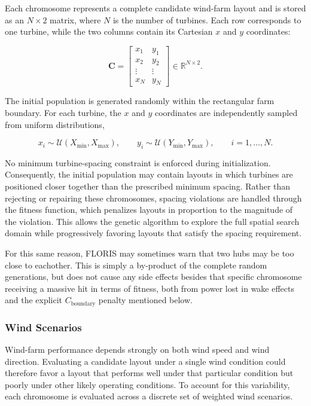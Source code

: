 \documentclass[11pt]{article}
\begin{document}
Each chromosome represents a complete candidate wind-farm layout and is stored as an $N \times 2$ matrix, where $N$ is the number of turbines. Each row corresponds to one turbine, while the two columns contain its Cartesian $x$ and $y$ coordinates:

\begin{equation}
\mathbf{C} =
\begin{bmatrix}
x_1 & y_1 \\
x_2 & y_2 \\
\vdots & \vdots \\
x_N & y_N
\end{bmatrix}
\in \mathbb{R}^{N \times 2}.
\label{eq:chromosome}
\end{equation}

The initial population is generated randomly within the rectangular farm boundary. For each turbine, the $x$ and $y$ coordinates are independently sampled from uniform distributions,

\begin{equation}
x_i \sim \mathcal{U}(X_{\min}, X_{\max}),
\qquad
y_i \sim \mathcal{U}(Y_{\min}, Y_{\max}),
\qquad i=1,\ldots,N.
\label{eq:initialization}
\end{equation}

No minimum turbine-spacing constraint is enforced during initialization. Consequently, the initial population may contain layouts in which turbines are positioned closer together than the prescribed minimum spacing. Rather than rejecting or repairing these chromosomes, spacing violations are handled through the fitness function, which penalizes layouts in proportion to the magnitude of the violation. This allows the genetic algorithm to explore the full spatial search domain while progressively favoring layouts that satisfy the spacing requirement.

For this same reason, FLORIS may sometimes warn that two hubs may be too close to eachother. This is simply a by-product of the complete random generations, but does not cause any side effects besides that specific chromosome receiving a massive hit in terms of fitness, both from power lost in wake effects and the explicit $C_{\mathrm{boundary}}$ penalty mentioned below.

\subsubsection{Wind Scenarios}
\label{ssec:wind-scenarios}

Wind-farm performance depends strongly on both wind speed and wind direction. Evaluating a candidate layout under a single wind condition could therefore favor a layout that performs well under that particular condition but poorly under other likely operating conditions. To account for this variability, each chromosome is evaluated across a discrete set of weighted wind scenarios.
\end{document}
